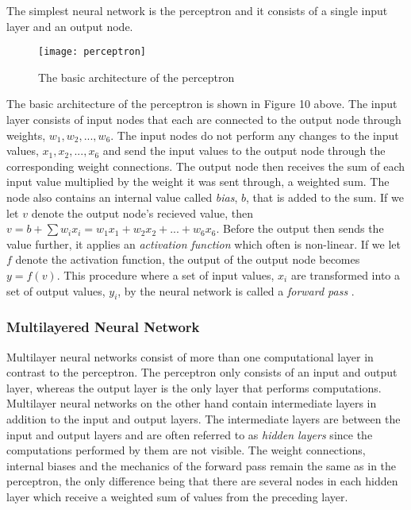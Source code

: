 \documentclass[titlepage]{article}
\begin{document}
\vskip 0.2cm

The simplest neural network is the perceptron \cite{charu} and it consists of a single input layer and an output node. 

\begin{figure}[h]
    \centering
    \texttt{[image: perceptron]}
    \caption{The basic architecture of the perceptron}
\end{figure}

\vskip 0.1cm

\noindent
The basic architecture of the perceptron is shown in Figure 10 above. The input layer consists of input nodes that each are connected to the output node through weights, $w_{1}, w_{2}, ..., w_{6}$. The input nodes do not perform any changes to the input values, $x_{1}, x_{2}, ..., x_{6}$ and send the input values to the output node through the corresponding weight connections. The output node then receives the sum of each input value multiplied by the weight it was sent through, a weighted sum. The node also contains an internal value called \emph{bias}, $b$, that is added to the sum. If we let $v$ denote the output node's recieved value, then $v = b + \sum w_{i} x_{i} = w_{1} x_{1} + w_{2} x_{2} + ... + w_{6} x_{6}$. Before the output then sends the value further, it applies an \emph{activation function} which often is non-linear. If we let $f$ denote the activation function, the output of the output node becomes $y = f(v)$. This procedure where a set of input values, $x_{i}$ are transformed into a set of output values, $y_{i}$, by the neural network is called a \emph{forward pass} \cite{charu}.

\subsubsection{Multilayered Neural Network}

\vskip 0.2cm

Multilayer neural networks consist of more than one computational layer \cite{charu} in contrast to the perceptron. The perceptron only consists of an input and output layer, whereas the output layer is the only layer that performs computations. Multilayer neural networks on the other hand contain intermediate layers in addition to the input and output layers. The intermediate layers are between the input and output layers and are often referred to as \emph{hidden layers} since the computations performed by them are not visible. The weight connections, internal biases and the mechanics of the forward pass remain the same as in the perceptron, the only difference being that there are several nodes in each hidden layer which receive a weighted sum of values from the preceding layer.
\end{document}
